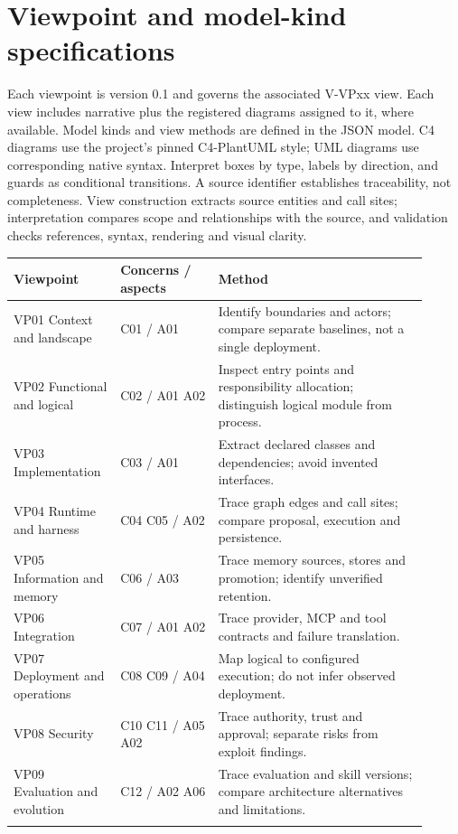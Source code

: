 \documentclass[10pt,letterpaper]{article}
\begin{document}
\section{Viewpoint and model-kind specifications}
Each viewpoint is version 0.1 and governs the associated V-VPxx view. Each view includes narrative plus the registered diagrams assigned to it, where available. Model kinds and view methods are defined in the JSON model. C4 diagrams use the project's pinned C4-PlantUML style; UML diagrams use corresponding native syntax. Interpret boxes by type, labels by direction, and guards as conditional transitions. A source identifier establishes traceability, not completeness. View construction extracts source entities and call sites; interpretation compares scope and relationships with the source, and validation checks references, syntax, rendering and visual clarity.
\begin{longtable}{@{}>{\raggedright\arraybackslash}p{0.22\linewidth}>{\raggedright\arraybackslash}p{0.22\linewidth}>{\raggedright\arraybackslash}p{0.47\linewidth}@{}}
\toprule
Viewpoint & Concerns / aspects & Method\\\midrule\endhead
VP01 Context and landscape & C01 / A01 & Identify boundaries and actors; compare separate baselines, not a single deployment.\\\addlinespace
VP02 Functional and logical & C02 / A01 A02 & Inspect entry points and responsibility allocation; distinguish logical module from process.\\\addlinespace
VP03 Implementation & C03 / A01 & Extract declared classes and dependencies; avoid invented interfaces.\\\addlinespace
VP04 Runtime and harness & C04 C05 / A02 & Trace graph edges and call sites; compare proposal, execution and persistence.\\\addlinespace
VP05 Information and memory & C06 / A03 & Trace memory sources, stores and promotion; identify unverified retention.\\\addlinespace
VP06 Integration & C07 / A01 A02 & Trace provider, MCP and tool contracts and failure translation.\\\addlinespace
VP07 Deployment and operations & C08 C09 / A04 & Map logical to configured execution; do not infer observed deployment.\\\addlinespace
VP08 Security & C10 C11 / A05 A02 & Trace authority, trust and approval; separate risks from exploit findings.\\\addlinespace
VP09 Evaluation and evolution & C12 / A02 A06 & Trace evaluation and skill versions; compare architecture alternatives and limitations.\\\addlinespace
\bottomrule\end{longtable}
\end{document}
